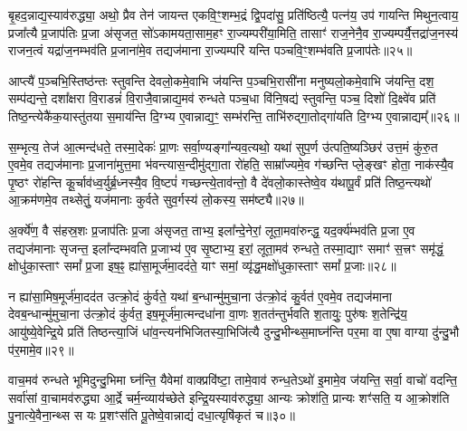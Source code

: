 बृ॒हद॒न्नाद्य॒स्याव॑रुद्ध्या॒ अथो॒ प्रैव तेन॑ जायन्त एकवि॒ꣳ॒शम्भ॒द्रं द्वि॒पदा॑सु॒ प्रति॑ष्ठित्यै॒ पत्न॑य॒ उप॑ गायन्ति मिथुन॒त्वाय॒ प्रजा᳚त्यै प्र॒जाप॑तिः प्र॒जा अ॑सृजत॒ सो॑\-ऽकामयता॒साम॒हꣳ रा॒ज्यम्परी॑या॒मिति॒ तासाꣳ॑ राज॒नेनै॒व रा॒ज्यम्पर्यै॒त्तद्रा॑ज॒नस्य॑ राजन॒त्वं यद्रा॑ज॒नम्भव॑ति प्र॒जाना॑मे॒व तद्यज॑माना रा॒ज्यम्परि॑ यन्ति पञ्चवि॒ꣳ॒शम्भ॑वति प्र॒जाप॑तेः॥२५॥

आप्त्यै॑ प॒ञ्चभि॒स्तिष्ठ॑न्तः स्तुवन्ति देवलो॒कमे॒वाभि ज॑यन्ति प॒ञ्चभि॒रासी॑ना मनुष्यलो॒कमे॒वाभि ज॑यन्ति॒ दश॒ सम्प॑द्यन्ते॒ दशा᳚क्षरा वि॒राडन्नं॑ वि॒राजै॒वान्नाद्य॒मव॑ रुन्धते पञ्च॒धा वि॑नि॒षद्य॑ स्तुवन्ति॒ पञ्च॒ दिशो॑ दि॒क्ष्वे॑व प्रति॑ तिष्ठ॒न्त्येकै॑क॒यास्तु॑तया स॒माय॑न्ति दि॒ग्भ्य ए॒वान्नाद्य॒ꣳ॒ सम्भ॑रन्ति॒ ताभि॑रुद्गा॒तोद्गा॑यति दि॒ग्भ्य ए॒वान्नाद्यम्᳚॥२६॥

स॒म्भृत्य॒ तेज॑ आ॒त्मन्द॑धते॒ तस्मा॒देकः॑ प्रा॒णः सर्वा॒ण्यङ्गा᳚न्यव॒त्यथो॒ यथा॑ सुप॒र्ण उ॑त्पति॒ष्यञ्छिर॑ उत्त॒मं कु॑रु॒त ए॒वमे॒व तद्यज॑मानाः प्र॒जाना॑मुत्त॒मा भ॑वन्त्यास॒न्दीमु॑द्गा॒ता रो॑हति॒ साम्रा᳚ज्यमे॒व ग॑च्छन्ति प्ले॒ङ्खꣳ होता॒ नाक॑स्यै॒व पृ॒ष्ठꣳ रो॑हन्ति कू॒र्चाव॑ध्व॒र्युर्ब्र॒ध्नस्यै॒व वि॒ष्टपं॑ गच्छन्त्ये॒ताव॑न्तो॒ वै दे॑वलो॒कास्तेष्वे॒व य॑थापू॒र्वं प्रति॑ तिष्ठ॒न्त्यथो॑ आ॒क्रम॑णमे॒व तथ्सेतुं॒ यज॑मानाः कुर्वते सुव॒र्गस्य॑ लो॒कस्य॒ सम॑ष्ट्यै॥२७॥

{\anuvakamend[{सद॑सः सप्तद॒शं प्र॒जाप॑तेर्गायति दि॒ग्भ्य ए॒वान्नाद्य॒म्प्रत्येका॑दश च॥८॥}]}

अ॒र्क्ये॑ण॒ वै स॑हस्र॒शः प्र॒जाप॑तिः प्र॒जा अ॑सृजत॒ ताभ्य॒ इला᳚न्दे॒नेरां॒ लूता॒मवा॑रुन्द्ध॒ यद॒र्क्य॑म्भव॑ति प्र॒जा ए॒व तद्यज॑मानाः सृजन्त॒ इला᳚न्दम्भवति प्र॒जाभ्य॑ ए॒व सृ॒ष्टाभ्य॒ इरां॒ लूता॒मव॑ रुन्धते॒ तस्मा॒द्याꣳ समाꣳ॑ स॒त्त्रꣳ समृ॑द्धं॒ क्षोधु॑का॒स्ताꣳ समां᳚ प्र॒जा इष॒ꣴ॒ ह्या॑सा॒मूर्ज॑मा॒दद॑ते॒ याꣳ समां॒ व्यृ॑द्ध॒मक्षो॑धुका॒स्ताꣳ समां᳚ प्र॒जाः॥२८॥

न ह्या॑सा॒मिष॒मूर्ज॑मा॒दद॑त उत्क्रो॒दं कु॑र्वते॒ यथा॑ ब॒न्धान्मु॑मुचा॒ना उ॑त्क्रो॒दं कु॒र्वत॑ ए॒वमे॒व तद्यज॑माना देवब॒न्धान्मु॑मुचा॒ना उ॑त्क्रो॒दं कु॑र्वत॒ इष॒मूर्ज॑मा॒त्मन्दधा॑ना वा॒णः श॒तत॑न्तुर्भवति श॒तायुः॒ पुरु॑षः श॒तेन्द्रि॑य॒ आयु॑ष्ये॒वेन्द्रि॒ये प्रति॑ तिष्ठन्त्या॒जिं धा॑व॒न्त्यन॑भिजितस्या॒भिजि॑त्यै दुन्दु॒भीन्थ्स॒माघ्न॑न्ति पर॒मा वा ए॒षा वाग्या दु॑न्दु॒भौ प॑र॒मामे॒व॥२९॥

वाच॒मव॑ रुन्धते भूमिदुन्दु॒भिमा घ्न॑न्ति॒ यैवेमां वाक्प्रवि॑ष्टा॒ तामे॒वाव॑ रुन्ध॒ते\-ऽथो॑ इ॒मामे॒व ज॑यन्ति॒ सर्वा॒ वाचो॑ वदन्ति॒ सर्वा॑सां वा॒चामव॑रुद्ध्या आ॒र्द्रे चर्म॒न्व्याय॑च्छेते इन्द्रि॒यस्याव॑रुद्ध्या॒ आन्यः क्रोश॑ति॒ प्रान्यः शꣳ॑सति॒ य आ॒क्रोश॑ति पु॒नात्ये॒वैना॒न्थ्स स यः प्र॒शꣳस॑ति पू॒तेष्वे॒वान्नाद्यं॑ दधा॒त्यृषि॑कृतं च॥३०॥

